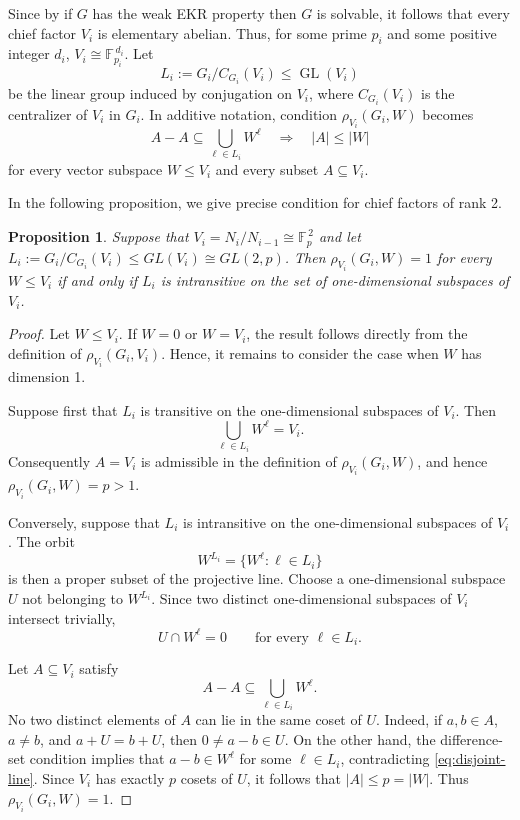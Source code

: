 \documentclass[11pt]{article}
\newtheorem{proposition}[theorem]{Proposition}
\begin{document}
Since by \cite[Theorem 2]{BardestaniMallahiKarai2015} if $G$ has the weak EKR property then \(G\) is solvable, it follows that every chief factor \(V_i\) is elementary abelian. 
Thus, for some prime \(p_i\) and some positive integer \(d_i\), \( V_i\cong \mathbb{F}_{p_i}^{\,d_i}. \) 
Let 
\[ L_i := G_i/C_{G_i}(V_i) \leq \operatorname{GL}(V_i) \] 
be the linear group induced by conjugation on \(V_i\), where $C_{G_i}(V_i)$ is the centralizer of $V_i$ in $G_i$. In additive notation, condition $\rho_{V_i}(G_i,W)$ becomes \[ A-A\subseteq\bigcup_{\ell\in L_i}W^\ell \quad\Longrightarrow\quad |A|\leq |W| \] for every vector subspace \(W\leq V_i\) and every subset \(A\subseteq V_i\).

In the following proposition, we give precise condition for chief factors of rank 2.
\begin{proposition}\label{prop: rank 2}
Suppose that $V_i=N_i/N_{i-1}\cong\mathbb{F}_{p}^{\,2}$ and let $L_i := G_i/C_{G_i}(V_i)\leq GL(V_i)\cong GL(2,p)$. Then $\rho_{V_i}(G_i,W)=1$ for every $W\leq V_i$ if and only if $L_i$ is intransitive on the set of one-dimensional subspaces of $V_i$.
\end{proposition}
\begin{proof}
  Let $W\leq V_i$. If $W=0$ or $W=V_i$, the result follows directly from the definition of $\rho_{V_i}(G_i,V_i)$. Hence, it remains to consider the case when $W$ has dimension 1.


Suppose first that \(L_i\) is transitive on the one-dimensional
subspaces of \(V_i\). Then
\[
\bigcup_{\ell\in L_i}W^\ell=V_i.
\]
Consequently \(A=V_i\) is admissible in the definition of
\(\rho_{V_i}(G_i,W)\), and hence $\rho_{V_i}(G_i,W)=p>1.$

Conversely, suppose that \(L_i\) is intransitive on the
one-dimensional subspaces of \(V_i\). The orbit
\[
W^{L_i}=\{W^\ell:\ell\in L_i\}
\]
is then a proper subset of the projective line. Choose a
one-dimensional subspace \(U\) not belonging to \(W^{L_i}\). Since two
distinct one-dimensional subspaces of \(V_i\) intersect trivially,
\begin{equation}
U\cap W^\ell=0
\qquad\text{for every }\ell\in L_i.
\label{eq:disjoint-line}
\end{equation}

Let \(A\subseteq V_i\) satisfy
\[
A-A\subseteq\bigcup_{\ell\in L_i}W^\ell.
\]
No two distinct elements of \(A\) can lie in the same coset of \(U\).
Indeed, if \(a,b\in A\), \(a\neq b\), and \(a+U=b+U\), then
\(
0\neq a-b\in U.
\)
On the other hand, the difference-set condition implies that
\(
a-b\in W^\ell
\)
for some \(\ell\in L_i\), contradicting
\eqref{eq:disjoint-line}. Since \(V_i\) has exactly \(p\) cosets of
\(U\), it follows that
\(
|A|\leq p=|W|.
\)
Thus
\(
\rho_{V_i}(G_i,W)=1.
\)
\end{proof}
\end{document}
